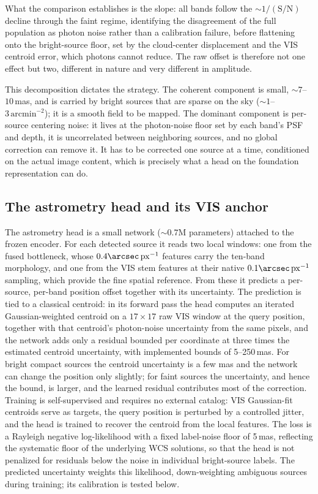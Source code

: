 \documentclass[twocolumn,linenumbers]{aastex701}
\newcommand{\arcsecpx}{\arcsec\,\mathrm{px}^{-1}}
\begin{document}
What the comparison establishes is the slope: all bands follow the ${\sim}1/(\mathrm{S/N})$ decline through the faint regime, identifying the disagreement of the full population as photon noise rather than a calibration failure, before flattening onto the bright-source floor, set by the cloud-center displacement and the VIS centroid error, which photons cannot reduce. The raw offset is therefore not one effect but two, different in nature and very different in amplitude.

This decomposition dictates the strategy. The coherent component is small, ${\sim}7$--$10$\,mas, and is carried by bright sources that are sparse on the sky (${\sim}1$--$3\,\mathrm{arcmin}^{-2}$); it is a smooth field to be mapped. The dominant component is per-source centering noise: it lives at the photon-noise floor set by each band's PSF and depth, it is uncorrelated between neighboring sources, and no global correction can remove it. It has to be corrected one source at a time, conditioned on the actual image content, which is precisely what a head on the foundation representation can do.

\subsection{The astrometry head and its VIS anchor}

The astrometry head is a small network (${\sim}0.7$M parameters) attached to the frozen encoder. For each detected source it reads two local windows: one from the fused bottleneck, whose $0.4\arcsecpx$ features carry the ten-band morphology, and one from the VIS stem features at their native $0.1\arcsecpx$ sampling, which provide the fine spatial reference. From these it predicts a per-source, per-band position offset together with its uncertainty. The prediction is tied to a classical centroid: in its forward pass the head computes an iterated Gaussian-weighted centroid on a $17\times17$ raw VIS window at the query position, together with that centroid's photon-noise uncertainty from the same pixels, and the network adds only a residual bounded per coordinate at three times the estimated centroid uncertainty, with implemented bounds of 5--250\,mas. For bright compact sources the centroid uncertainty is a few mas and the network can change the position only slightly; for faint sources the uncertainty, and hence the bound, is larger, and the learned residual contributes most of the correction. Training is self-supervised and requires no external catalog: VIS Gaussian-fit centroids serve as targets, the query position is perturbed by a controlled jitter, and the head is trained to recover the centroid from the local features. The loss is a Rayleigh negative log-likelihood with a fixed label-noise floor of 5\,mas, reflecting the systematic floor of the underlying WCS solutions, so that the head is not penalized for residuals below the noise in individual bright-source labels. The predicted uncertainty weights this likelihood, down-weighting ambiguous sources during training; its calibration is tested below.
\end{document}
